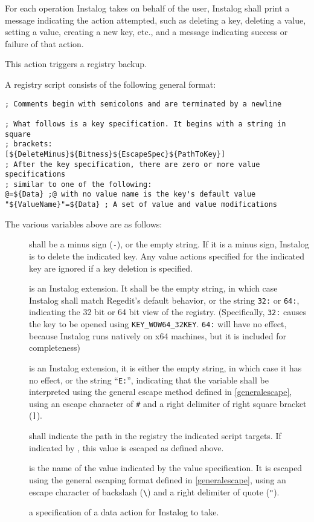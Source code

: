 For each operation Instalog takes on behalf of the user, Instalog shall print a
message indicating the action attempted, such as deleting a key, deleting a
value, setting a value, creating a new key, etc., and a message indicating
success or failure of that action.

This action triggers a registry backup.

A registry script consists of the following general format:
\begin{verbatim}
; Comments begin with semicolons and are terminated by a newline

; What follows is a key specification. It begins with a string in square
; brackets:
[${DeleteMinus}${Bitness}${EscapeSpec}${PathToKey}]
; After the key specification, there are zero or more value specifications
; similar to one of the following:
@=${Data} ;@ with no value name is the key's default value
"${ValueName}"=${Data} ; A set of value and value modifications
\end{verbatim}

The various variables above are as follows:
\begin{description}
\item[] shall be a minus sign (\verb|-|), or the empty string.
If it is a minus sign, Instalog is to delete the indicated key. Any value
actions specified for the indicated key are ignored if a key deletion is
specified.
\item[] is an Instalog extension. It shall be the empty string, in
which case Instalog shall match Regedit's default behavior, or the string
\verb|32:| or \verb|64:|, indicating the 32 bit or 64 bit view of the registry.
(Specifically, \verb|32:| causes the key to be opened using
\verb|KEY_WOW64_32KEY|. \verb|64:| will have no effect, because Instalog runs
natively on x64 machines, but it is included for completeness)
\item[] is an Instalog extension, it is either the empty string,
in which case it has no effect, or the string ``\verb|E:|'', indicating that the
 variable shall be interpreted using the general escape method
defined in \ref{generalescape}, using an escape character of \verb|#| and a
right delimiter of right square bracket (\verb|]|).
\item[] shall indicate the path in the registry the indicated
script targets. If indicated by , this value is escaped as
defined above.
\item[] is the name of the value indicated by the value
specification. It is escaped using the general escaping format defined in
\ref{generalescape}, using an escape character of backslash (\verb|\|) and a
right delimiter of quote (\verb|"|).
\item[] a specification of a data action for Instalog to take.
\end{description}

